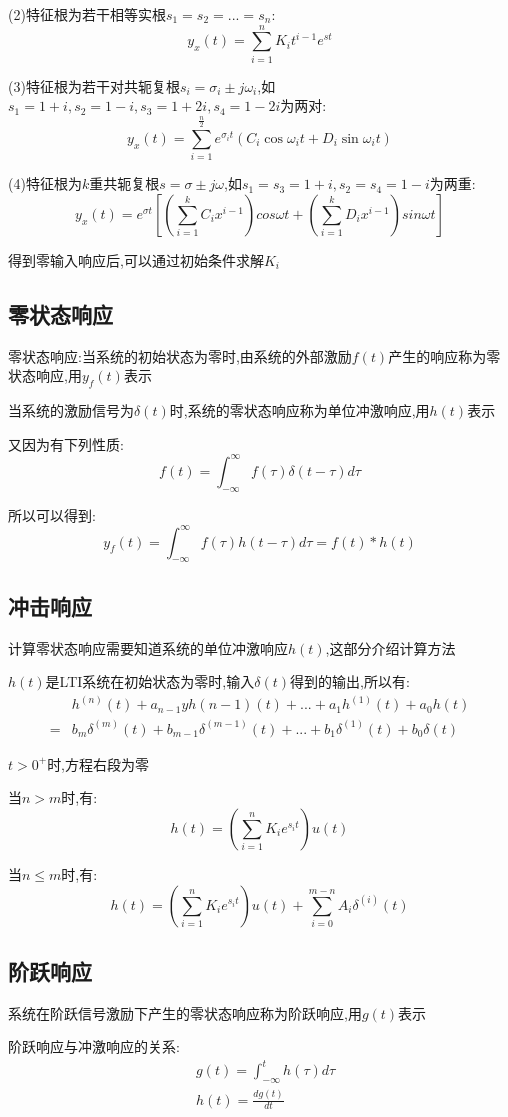 \documentclass[12pt, a4paper, oneside]{ctexart}
\begin{document}
(2)特征根为若干相等实根$s_1=s_2=...=s_n$:
\[
    y_x(t)=\sum_{i=1}^{n}K_it^{i-1}e^{st}
\]

(3)特征根为若干对共轭复根$s_i=\sigma_i \pm j\omega_i$,如$s_1=1+i,s_2=1-i,s_3=1+2i,s_4=1-2i$为两对:
\[
    y_x(t)=\sum_{i=1}^{\frac{n}{2}}e^{\sigma_i t}(C_i\cos \omega_i t+D_i\sin \omega_i t)
\]

(4)特征根为$k$重共轭复根$s=\sigma \pm j\omega$,如$s_1=s_3=1+i,s_2=s_4=1-i$为两重:
\[
    y_x(t)=e^{\sigma t}\left[\left(\sum_{i=1}^{k}C_ix^{i-1}\right)cos \omega t + \left(\sum_{i=1}^{k}D_ix^{i-1}\right)sin\omega t\right]
\]

得到零输入响应后,可以通过初始条件求解$K_i$

\subsection{零状态响应}
零状态响应:当系统的初始状态为零时,由系统的外部激励$f(t)$产生的响应称为零状态响应,用$y_f(t)$表示

当系统的激励信号为$\delta(t)$时,系统的零状态响应称为单位冲激响应,用$h(t)$表示

又因为有下列性质:
\[
    f(t)=\int_{-\infty}^{\infty}f(\tau)\delta(t-\tau)d\tau
\]

所以可以得到:
\[
    y_f(t)=\int_{-\infty}^{\infty}f(\tau)h(t-\tau)d\tau=f(t)\ast h(t)
\]

\subsection{冲击响应}
计算零状态响应需要知道系统的单位冲激响应$h(t)$,这部分介绍计算方法

$h(t)$是LTI系统在初始状态为零时,输入$\delta(t)$得到的输出,所以有:
\begin{align*}
    &h^{(n)}(t)+a_{n-1}yh{(n-1)}(t)+...+a_1h^{(1)}(t)+a_0h(t)\\
    = &b_m\delta^{(m)}(t)+b_{m-1}\delta^{(m-1)}(t)+...+b_1\delta^{(1)}(t)+b_0\delta(t)
\end{align*}

$t>0^+$时,方程右段为零

当$n>m$时,有:
\[
    h(t)=\left(\sum_{i=1}^{n}K_ie^{s_it}\right)u(t)
\]

当$n \leqslant m$时,有:
\[
    h(t)=\left(\sum_{i=1}^{n}K_ie^{s_it}\right)u(t)+\sum_{i=0}^{m-n}A_i\delta^{(i)}(t)
\]

\subsection{阶跃响应}
系统在阶跃信号激励下产生的零状态响应称为阶跃响应,用$g(t)$表示

阶跃响应与冲激响应的关系:
\begin{align*}
    &g(t)=\int_{-\infty}^{t}h(\tau)d\tau\\
    &h(t)=\frac{dg(t)}{dt}
\end{align*}
\end{document}
